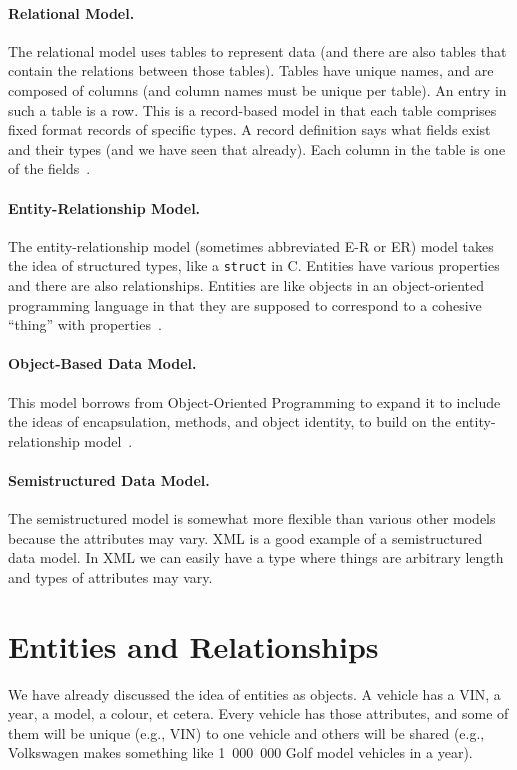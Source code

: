 \documentclass[a4paper]{report}
\begin{document}
\paragraph{Relational Model.} The relational model uses tables to represent data (and there are also tables that contain the relations between those tables). Tables have unique names, and are composed of columns (and column names must be unique per table). An entry in such a table is a row. This is a record-based model in that each table comprises fixed format records of specific types. A record definition says what fields exist and their types (and we have seen that already). Each column in the table is one of the fields~\cite{dsc}.


\paragraph{Entity-Relationship Model.} The entity-relationship model (sometimes abbreviated E-R or ER) model takes the idea of structured types, like a \texttt{struct} in C. Entities have various properties and there are also relationships. Entities are like objects in an object-oriented programming language in that they are supposed to correspond to a cohesive ``thing'' with properties~\cite{dsc}.

\paragraph{Object-Based Data Model.} This model borrows from Object-Oriented Programming to expand it to include the ideas of encapsulation, methods, and object identity, to build on the entity-relationship model~\cite{dsc}.

\paragraph{Semistructured Data Model.} The semistructured model is somewhat more flexible than various other models because the attributes may vary. XML is a good example of a semistructured data model. In XML we can easily have a type where things are arbitrary length and types of attributes may vary. 

\section*{Entities and Relationships}

We have already discussed the idea of entities as objects. A vehicle has a VIN, a year, a model, a colour, et cetera. Every vehicle has those attributes, and some of them will be unique (e.g., VIN) to one vehicle and others will be shared (e.g., Volkswagen makes something like 1~000~000 Golf model vehicles in a year). 
\end{document}
